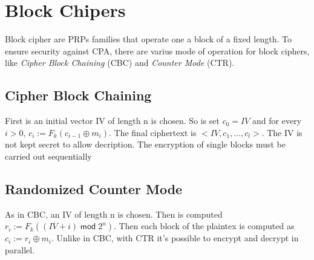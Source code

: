 \section{Block Chipers}
Block cipher are PRPs families that operate one a block of a fixed length. To ensure security against CPA, there are varius mode of operation for block ciphers, like \emph{Cipher Block Chaining} (CBC) and \emph{Counter Mode} (CTR).

\subsection{Cipher Block Chaining}
First is an initial vector IV of length n is chosen. So is set $c_0 = IV$ and for every $i > 0$, $c_i := F_k(c_{i-1} \oplus m_i)$. The final ciphertext is $<IV,c_1,...,c_l>$. The IV is not kept secret to allow decription. The encryption of single blocks must be carried out sequentially

\subsection{Randomized Counter Mode}
As in CBC, an IV of length n is chosen. Then is computed $r_i := F_k((IV + i)\;\mathsf{mod}\;2^n)$. Then each block of the plaintex is computed as $c_i := r_i \oplus m_i$. Unlike in CBC, with CTR it's possible to encrypt and decrypt in parallel.

